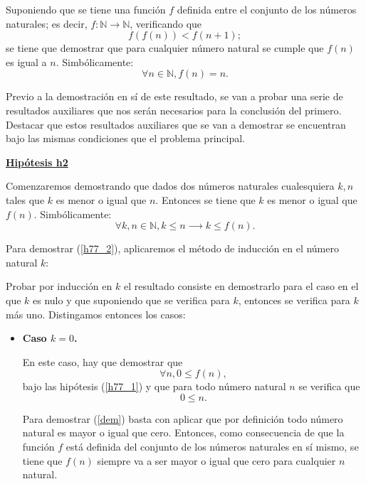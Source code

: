 \begin{demostracion}
  Suponiendo que se tiene una función \(f\) definida entre el conjunto
  de los números naturales; es decir, \(f: ℕ → ℕ\), verificando
  que
  \begin{equation}\label{h77_1}\tag{h1}
     f(f(n)) < f(n+1);
  \end{equation}
  se tiene que demostrar que para cualquier número natural se cumple
  que \(f(n)\) es igual a \(n\). Simbólicamente:
  \begin{equation}
    ∀ n ∈ ℕ, f(n) = n.
  \end{equation}

  Previo a la demostración en sí de este resultado, se van a probar una
  serie de resultados auxiliares que nos serán necesarios para la
  conclusión del primero. Destacar que estos resultados auxiliares que
  se van a demostrar se encuentran bajo las mismas condiciones que el
  problema principal.

  \noindent
  \textbf{\underline{Hipótesis h2}}

  Comenzaremos demostrando que dados dos números naturales cualesquiera
  \(k,n\) tales que \(k\) es menor o igual que \(n\).  Entonces se tiene
  que \(k\) es menor o igual que \(f(n)\).  Simbólicamente:
  \begin{equation}\label{h77_2}\tag{h2}
    ∀ k, n ∈ ℕ, k ≤ n ⟶ k ≤ f(n).
  \end{equation}

  Para demostrar (\ref{h77_2}), aplicaremos el método de inducción en el
  número natural \(k\):

  Probar por inducción en \(k\) el resultado consiste en demostrarlo
  para el caso en el que \(k\) es nulo y que suponiendo que se
  verifica para \(k\), entonces se verifica para \(k\) más uno.
  Distingamos entonces los casos:

  \begin{itemize}
    \item \textbf{Caso \(k=0\).}

      En este caso, hay que demostrar que
      \begin{equation}\label{dem}
        ∀n, 0 ≤ f(n),
      \end{equation}
      bajo las hipótesis (\ref{h77_1}) y que para todo número natural
      \(n\) se verifica que
      \begin{equation}
        0 ≤ n.
      \end{equation}

      Para demostrar (\ref{dem}) basta con aplicar que por definición
      todo número natural es mayor o igual que cero. Entonces, como
      consecuencia de que la función \(f\) está definida del conjunto de
      los números naturales en sí mismo, se tiene que \(f(n)\) siempre
      va a ser mayor o igual que cero para cualquier \(n\) natural.


\end{itemize}
\end{demostracion}
